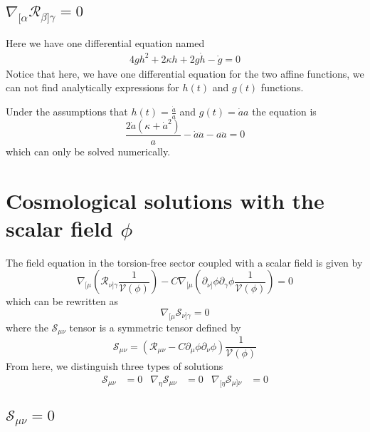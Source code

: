 \documentclass[10pt,a4paper]{article}
\begin{document}
\subsection{$\nabla_{[\alpha}\mathcal{R}_{\beta]\gamma}  = 0$}

Here we have one differential equation named
\begin{align}
  4gh^2 + 2\kappa h + 2g\dot{h} - \ddot{g} = 0
\end{align}
Notice that here, we have one differential equation for the two affine functions, we can not find analytically expressions for $h(t)$ and $g(t)$ functions.

Under the assumptions that $h(t) = \frac{\dot{a}}{a}$ and $g(t) = \dot{a}a$ the equation is
\begin{equation}
  \frac{2\dot{a}\left(\kappa + \dot{a}^2\right)}{a} - \dot{a}\ddot{a} - a\dddot{a} = 0
\end{equation}
which can only be solved numerically.




\section{Cosmological solutions with the scalar field $\phi$}

The field equation in the torsion-free sector coupled with a scalar field is given by
\begin{equation}
  \nabla_{[\mu}\left(\mathcal{R}_{\nu]\gamma}\frac{1}{\mathcal{V}(\phi)}\right) 
  - C \nabla_{[\mu}\left(\partial_{\nu]} \phi \partial_\gamma \phi \frac{1}{\mathcal{V}(\phi)}\right) = 0
\end{equation}
which can be rewritten as
\begin{equation}
  \nabla_{[\mu}\mathcal{S}_{\nu]\gamma} = 0
\end{equation}
where the $\mathcal{S}_{\mu\nu}$ tensor is a symmetric tensor defined by
\begin{equation}
  \mathcal{S}_{\mu\nu} = \left(\mathcal{R}_{\mu\nu} - C \partial_{\mu} \phi \partial_\nu \phi \right)\frac{1}{\mathcal{V}(\phi)}
\end{equation}
From here, we distinguish three types of solutions
\begin{align}
  \mathcal{S}_{\mu\nu} & = 0 & \nabla_{\eta} \mathcal{S}_{\mu\nu} & = 0 & \nabla_{[\eta} \mathcal{S}_{\mu]\nu} & = 0
\end{align}

\subsection{$\mathcal{S}_{\mu\nu} = 0 $}
\end{document}
